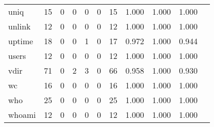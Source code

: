 \begin{longtable}{lp{1.10cm}p{1.10cm}p{1.10cm}p{1.10cm}p{1.10cm}p{1.10cm}p{1.10cm}p{1.10cm}p{1.10cm}p{1.10cm}}
uniq      &                     15 &                                  0 &                                 0 &                                0 &                                 0 &                              15 &                          1.000 &                                 1.000 &                               1.000 \\
unlink    &                     12 &                                  0 &                                 0 &                                0 &                                 0 &                              12 &                          1.000 &                                 1.000 &                               1.000 \\
uptime    &                     18 &                                  0 &                                 0 &                                1 &                                 0 &                              17 &                          0.972 &                                 1.000 &                               0.944 \\
users     &                     12 &                                  0 &                                 0 &                                0 &                                 0 &                              12 &                          1.000 &                                 1.000 &                               1.000 \\
vdir      &                     71 &                                  0 &                                 2 &                                3 &                                 0 &                              66 &                          0.958 &                                 1.000 &                               0.930 \\
wc        &                     16 &                                  0 &                                 0 &                                0 &                                 0 &                              16 &                          1.000 &                                 1.000 &                               1.000 \\
who       &                     25 &                                  0 &                                 0 &                                0 &                                 0 &                              25 &                          1.000 &                                 1.000 &                               1.000 \\
whoami    &                     12 &                                  0 &                                 0 &                                0 &                                 0 &                              12 &                          1.000 &                                 1.000 &                               1.000 \\

\end{longtable}
